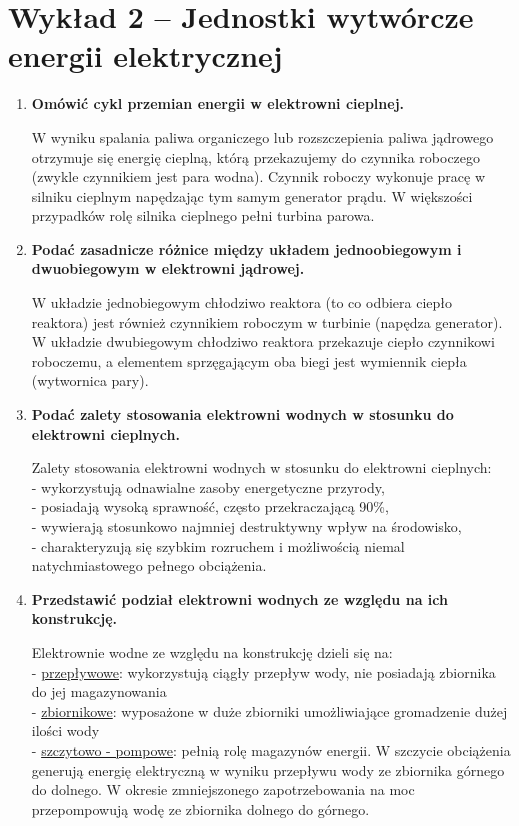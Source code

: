 \documentclass[12pt]{article}
\begin{document}
\section{Wykład 2 -- Jednostki wytwórcze energii elektrycznej}
\begin{enumerate}
    \item \textbf{Omówić cykl przemian energii w elektrowni cieplnej.}

        W wyniku spalania paliwa organiczego lub rozszczepienia paliwa jądrowego otrzymuje się energię cieplną,
        którą przekazujemy do czynnika roboczego (zwykle czynnikiem jest para wodna). Czynnik roboczy wykonuje pracę 
        w silniku cieplnym napędzając tym samym generator prądu. W większości przypadków rolę silnika cieplnego pełni turbina parowa.

    \item \textbf{Podać zasadnicze różnice między układem jednoobiegowym i dwuobiegowym w elektrowni jądrowej.}
    
        W układzie jednobiegowym chłodziwo reaktora (to co odbiera ciepło reaktora) jest również czynnikiem roboczym
        w turbinie (napędza generator).\\
        W układzie dwubiegowym chłodziwo reaktora przekazuje ciepło czynnikowi roboczemu, a elementem sprzęgającym
        oba biegi jest wymiennik ciepła (wytwornica pary).

    \item \textbf{Podać zalety stosowania elektrowni wodnych w stosunku do elektrowni cieplnych.}

        Zalety stosowania elektrowni wodnych w stosunku do elektrowni cieplnych:\\
        - wykorzystują odnawialne zasoby energetyczne przyrody,\\
        - posiadają wysoką sprawność, często przekraczającą 90\%,\\
        - wywierają stosunkowo najmniej destruktywny wpływ na środowisko,\\
        - charakteryzują się szybkim rozruchem i możliwością niemal natychmiastowego pełnego obciążenia.
    
    \item \textbf{Przedstawić podział elektrowni wodnych ze względu na ich konstrukcję.}
    
        Elektrownie wodne ze względu na konstrukcję dzieli się na:\\
        - \underline{przepływowe}: wykorzystują ciągły przepływ wody, nie posiadają zbiornika do jej magazynowania\\
        - \underline{zbiornikowe}: wyposażone w duże zbiorniki umożliwiające gromadzenie dużej ilości wody\\
        - \underline{szczytowo - pompowe}: pełnią rolę magazynów energii. W szczycie obciążenia generują energię elektryczną w wyniku
        przepływu wody ze zbiornika górnego do dolnego. W okresie zmniejszonego zapotrzebowania na moc przepompowują
        wodę ze zbiornika dolnego do górnego.


\end{enumerate}
\end{document}
